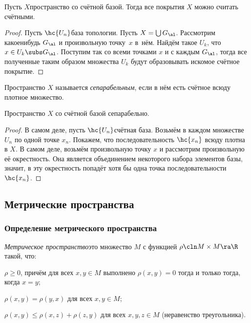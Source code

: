 \documentclass[a4paper]{article}
\begin{document}
\begin{stm}
Пусть $X$\т пространство со счётной базой. Тогда все покрытия $X$ можно считать счётными.
\end{stm}
\begin{proof}
Пусть $\hc{U_n}$\т база топологии. Пусть $X = \bigcup G_\al$. Рассмотрим какое\д нибудь
$G_\al$ и произвольную точку~$x$ в~нём. Найдём такое $U_k$, что $x \in U_k \subs G_\al$.
Поступим так со всеми точками $x$ и с каждым $G_\al$, тогда все полученные таким образом
множества $U_k$ будут образовывать искомое счётное покрытие.
\end{proof}

\begin{df}
Пространство $X$ называется \emph{сепарабельным}, если в нём есть счётное всюду плотное множество.
\end{df}


\begin{stm}
Пространство $X$ со счётной базой сепарабельно.
\end{stm}
\begin{proof}
В самом деле, пусть $\hc{U_n}$\т счётная база. Возьмём в каждом множестве $U_n$
по одной точке $x_n$. Покажем, что последовательность $\hc{x_n}$ всюду плотна в $X$.
В самом деле, возьмём произвольную точку $x$ и рассмотрим произвольную её окрестность.
Она является объединением некоторого набора элементов базы, значит, в эту окрестность
попадёт хотя бы одна точка последовательности $\hc{x_n}$.
\end{proof}


\subsection{Метрические пространства}

\subsubsection{Определение метрического пространства}

\begin{df}
\emph{Метрическое пространство}\т это множество $M$ с функцией $\rho\cln M\times M \ra \R$ такой, что:
\begin{items}{-3}
\item $\rho \ge 0$, причём для всех $x, y\in M$ выполнено $\rho(x,y) = 0$ тогда и только тогда, когда $x = y$;
\item $\rho(x,y) = \rho(y,x)$ для всех $x, y \in M$;
\item $\rho(x,y) \le \rho(x,z) + \rho(z,y)$ для всех $x,y,z \in M$ (неравенство треугольника).
\end{items}
\end{df}
\end{document}
